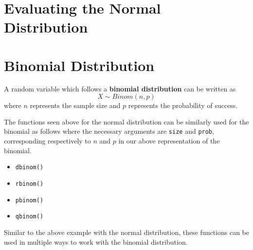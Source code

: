 \documentclass{report}\usepackage[]{graphicx}\usepackage[]{color}
\begin{document}
\section{Evaluating the Normal Distribution}

\section{Binomial Distribution}
A random variable which follows a \textbf{binomial distribution} can be written as
\[ X \sim Binom(n,p) \]
where $n$ represents the sample size and $p$ represents the probability of success.  

The functions seen above for the normal distribution can be similarly used for the binomial as follows where the necessary arguments are \texttt{size} and \texttt{prob}, corresponding respectively to $n$ and $p$ in our above representation of the binomial.
\begin{itemize} 
\item \texttt{dbinom()}
\item \texttt{rbinom()}
\item \texttt{pbinom()}
\item \texttt{qbinom()}
\end{itemize}

Similar to the above example with the normal distribution, these functions can be used in multiple ways to work with the binomial distribution.  
\end{document}
